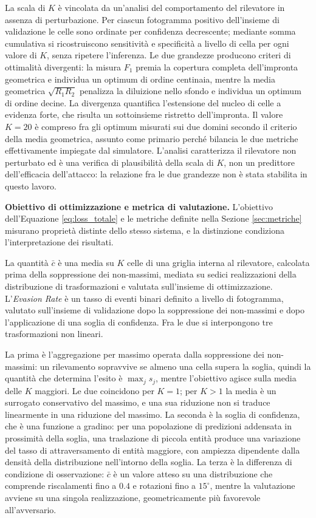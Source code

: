 \documentclass[a4paper,12pt]{report}
\begin{document}
La scala di $K$ è vincolata da un'analisi del comportamento del rilevatore in
assenza di perturbazione. Per ciascun fotogramma positivo dell'insieme di
validazione le celle sono ordinate per confidenza decrescente; mediante somma
cumulativa si ricostruiscono sensitività e specificità a livello di cella per
ogni valore di $K$, senza ripetere l'inferenza. Le due grandezze producono
criteri di ottimalità divergenti: la misura $F_1$ premia la copertura completa
dell'impronta geometrica e individua un optimum di ordine centinaia, mentre la
media geometrica $\sqrt{R_1 R_2}$ penalizza la diluizione nello sfondo e
individua un optimum di ordine decine. La divergenza quantifica l'estensione del
nucleo di celle a evidenza forte, che risulta un sottoinsieme ristretto
dell'impronta. Il valore $K = 20$ è compreso fra gli optimum misurati sui due
domini secondo il criterio della media geometrica, assunto come primario perché
bilancia le due metriche effettivamente impiegate dal simulatore. L'analisi
caratterizza il rilevatore non perturbato ed è una verifica di
plausibilità della scala di $K$, non un predittore dell'efficacia dell'attacco:
la relazione fra le due grandezze non è stata stabilita in questo lavoro.

\textbf{Obiettivo di ottimizzazione e metrica di valutazione.}
\label{sec:divario}
L'obiettivo dell'Equazione \ref{eq:loss_totale} e le metriche definite nella
Sezione \ref{sec:metriche} misurano proprietà distinte dello stesso sistema, e
la distinzione condiziona l'interpretazione dei risultati.

La quantità $\bar{c}$ è una media su $K$ celle di una griglia interna al
rilevatore, calcolata prima della soppressione dei non-massimi, mediata su
sedici realizzazioni della distribuzione di trasformazioni e valutata
sull'insieme di ottimizzazione. L'\textit{Evasion Rate} è un tasso di eventi
binari definito a livello di fotogramma, valutato sull'insieme di validazione
dopo la soppressione dei non-massimi e dopo l'applicazione di una soglia di
confidenza. Fra le due si interpongono tre trasformazioni non lineari.

La prima è l'aggregazione per massimo operata dalla soppressione dei
non-massimi: un rilevamento sopravvive se almeno una cella supera la soglia,
quindi la quantità che determina l'esito è $\max_j s_j$, mentre l'obiettivo
agisce sulla media delle $K$ maggiori. Le due coincidono per $K = 1$; per $K >
1$ la media è un surrogato conservativo del massimo, e una sua riduzione non si
traduce linearmente in una riduzione del massimo. La seconda è la soglia di
confidenza, che è una funzione a gradino: per una popolazione di predizioni
addensata in prossimità della soglia, una traslazione di piccola entità produce
una variazione del tasso di attraversamento di entità maggiore, con ampiezza
dipendente dalla densità della distribuzione nell'intorno della soglia. La terza
è la differenza di condizione di osservazione: $\bar{c}$ è un valore atteso su
una distribuzione che comprende riscalamenti fino a $0.4$ e rotazioni fino a
$15^\circ$, mentre la valutazione avviene su una singola realizzazione,
geometricamente più favorevole all'avversario.
\end{document}
